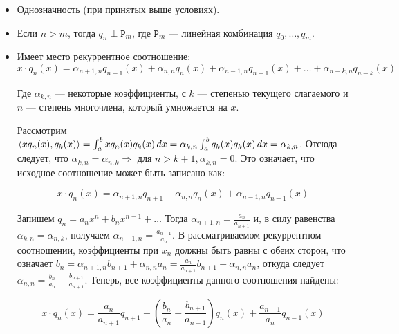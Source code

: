 \documentclass[12pt]{article}
\begin{document}
		\begin{itemize}
			\item Однозначность (при принятых выше условиях).
			\item Если $n > m$, тогда $q_n \perp \mathtt{P}_m$, где $\mathtt{P}_m$ --- линейная комбинация $q_0, \dots , q_m$.
			\item Имеет место рекуррентное соотношение:
			$$ x \cdot q_n(x) = 
			\alpha_{n+1,n} q_{n+1}(x) + \alpha_{n,n} q_n(x) + \alpha_{n-1, n} q_{n-1} (x) + \ldots + \alpha_{n-k, n} q_{n-k} (x) $$
		
				Где $\alpha_{k, n}$ --- некоторые коэффициенты, с $k$ --- степенью текущего слагаемого и
				$n$ --- степень многочлена, который умножается на $x$.

				Рассмотрим $\left\langle x q_n(x), q_k(x) \right\rangle = \int_a^b x q_n(x) q_k(x) \,dx
					        = \alpha_{k,n} \int_a^b q_k(x) q_k(x) \,dx = \alpha_{k,n}$.
				Отсюда следует, что $\alpha_{k,n} = \alpha_{n,k} \Rightarrow$ для $n > k+1,\alpha_{k,n} = 0$. 
				Это означает, что исходное соотношение может быть записано как:

				$$ x \cdot q_n(x) = 
				\alpha_{n+1,n} q_{n+1} + \alpha_{n,n} q_n(x) + \alpha_{n-1, n} q_{n-1} (x)$$

				Запишем $q_n = a_n x^n + b_n x^{n-1} + \ldots$
				Тогда $\alpha_{n+1, n} = \frac{a_n}{a_{n+1}}$ и, в силу равенства $\alpha_{k,n} =
				\alpha_{n,k}$, получаем $\alpha_{n-1, n} = \frac{a_{n-1}}{a_n}$. В рассматриваемом
				рекуррентном соотношении, коэффициенты при $x_n$ должны быть равны с обеих
				сторон, что означает $b_n = \alpha_{n+1, n} b_{n+1} + \alpha_{n,n} a_n =
				\frac{a_n}{a_{n+1}} b_{n+1} + \alpha_{n,n} a_n$, откуда следует $\alpha_{n,n} =
				\frac{b_n}{a_n} - \frac{b_{n+1}}{a_{n+1}}$. Теперь, все коэффициенты данного соотношения
				найдены:

				\begin{equation}
					\label{eq:recurrent}
					x \cdot q_n(x) = \frac{a_n}{a_{n+1}} q_{n+1} + 
					\left(\frac{b_n}{a_n} - \frac{b_{n+1}}{a_{n+1}}\right) q_n(x) + \frac{a_{n-1}}{a_n} q_{n-1}(x)
				\end{equation}
		\end{itemize}
\end{document}
